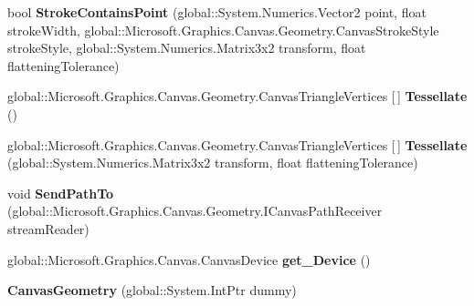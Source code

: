 \begin{DoxyCompactItemize}
bool {\bfseries Stroke\+Contains\+Point} (global\+::\+System.\+Numerics.\+Vector2 point, float stroke\+Width, global\+::\+Microsoft.\+Graphics.\+Canvas.\+Geometry.\+Canvas\+Stroke\+Style stroke\+Style, global\+::\+System.\+Numerics.\+Matrix3x2 transform, float flattening\+Tolerance)
\item 
\mbox{\label{class_microsoft_1_1_graphics_1_1_canvas_1_1_geometry_1_1_canvas_geometry_a0a66062ad10deeea0d4c354fa37dd1e5}} 
global\+::\+Microsoft.\+Graphics.\+Canvas.\+Geometry.\+Canvas\+Triangle\+Vertices \mbox{[}$\,$\mbox{]} {\bfseries Tessellate} ()
\item 
\mbox{\label{class_microsoft_1_1_graphics_1_1_canvas_1_1_geometry_1_1_canvas_geometry_ad81e27003f60c585c31cd07e1bd2a92a}} 
global\+::\+Microsoft.\+Graphics.\+Canvas.\+Geometry.\+Canvas\+Triangle\+Vertices \mbox{[}$\,$\mbox{]} {\bfseries Tessellate} (global\+::\+System.\+Numerics.\+Matrix3x2 transform, float flattening\+Tolerance)
\item 
\mbox{\label{class_microsoft_1_1_graphics_1_1_canvas_1_1_geometry_1_1_canvas_geometry_ac6b1c589bbbc82f3130c0f1164401983}} 
void {\bfseries Send\+Path\+To} (global\+::\+Microsoft.\+Graphics.\+Canvas.\+Geometry.\+I\+Canvas\+Path\+Receiver stream\+Reader)
\item 
\mbox{\label{class_microsoft_1_1_graphics_1_1_canvas_1_1_geometry_1_1_canvas_geometry_a5c318bc4d58999fcf66c9bafd45ffe8b}} 
global\+::\+Microsoft.\+Graphics.\+Canvas.\+Canvas\+Device {\bfseries get\+\_\+\+Device} ()
\item 
\mbox{\label{class_microsoft_1_1_graphics_1_1_canvas_1_1_geometry_1_1_canvas_geometry_aa2808482bc01ed6dfc625b6e9d3ef3ca}} 
{\bfseries Canvas\+Geometry} (global\+::\+System.\+Int\+Ptr dummy)
\item 
\mbox{\label{class_microsoft_1_1_graphics_1_1_canvas_1_1_geometry_1_1_canvas_geometry_a6173265c5e6f97788ac9715a18ee8b03}} 

\end{DoxyCompactItemize}

